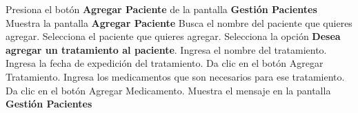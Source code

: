  \begin{UCtrayectoria}
 	
 	\UCpaso [\UCactor] Presiona el botón \textbf{Agregar Paciente} de la pantalla \textbf{Gestión Pacientes}
 	\UCpaso Muestra la pantalla \textbf{Agregar Paciente}
 	\UCpaso [\UCactor] Busca el nombre del paciente que quieres agregar.
 	\UCpaso [\UCactor] Selecciona el paciente que quieres agregar.
 	\UCpaso [\UCactor] Selecciona la opción \textbf{Desea agregar un tratamiento al paciente}.
 	\UCpaso [\UCactor] Ingresa el nombre del tratamiento.
 	\UCpaso [\UCactor] Ingresa la fecha de expedición del tratamiento.
 	\UCpaso [\UCactor] Da clic en el botón Agregar Tratamiento.
 	\UCpaso [\UCactor] Ingresa los medicamentos que son necesarios para ese tratamiento.
 	\UCpaso [\UCactor] Da clic en el botón Agregar Medicamento.
 	\UCpaso Muestra el mensaje  en la pantalla \textbf{Gestión Pacientes} 
 	
 \end{UCtrayectoria}


%

